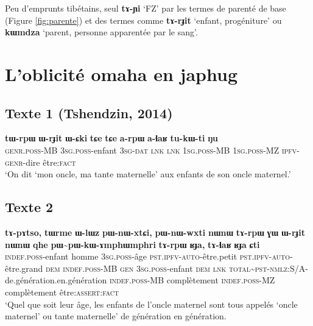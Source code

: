 \documentclass[oneside,a4paper,11pt]{article}
\newcommand{\ipa}[1]{{\phon\textbf{#1}}}
\newcommand{\tld}{\textasciitilde{}}
\begin{document}
Peu d'emprunts tibétains, seul \ipa{tɤ-ɲi} `FZ' par les termes de parenté de base (Figure \ref{fig:parente}) et des termes comme \ipa{tɤ-rɟit} `enfant, progéniture' ou \ipa{kɯmdza} `parent, personne apparentée par le sang'.
\section{L'oblicité omaha en japhug}
\subsection{Texte 1 (Tshendzin, 2014)}
\begin{exe}
\ex 
\gll 
 \ipa{tɯ-rpɯ} 	\ipa{ɯ-rɟit} 	\ipa{ɯ-ɕki} 	\ipa{tɕe} 	\ipa{tɕe} 	\ipa{a-rpɯ} \ipa{a-ɬaʁ} 	\ipa{tu-kɯ-ti} 	\ipa{ŋu}  \\
 \textsc{genr.poss}-MB \textsc{3sg.poss}-enfant \textsc{3sg-dat} \textsc{lnk}  \textsc{lnk}  \textsc{1sg.poss}-MB \textsc{1sg.poss}-MZ \textsc{ipfv-genr}-dire être:\textsc{fact} \\
\glt `On dit `mon oncle, ma tante maternelle' aux enfants de son oncle maternel.'
\end{exe}
\subsection{Texte 2}
\begin{exe}
\ex 
\gll 
\ipa{tɤ-pɤtso,} 	\ipa{tɯrme} 	\ipa{ɯ-lɯz} 	\ipa{pɯ-nɯ-xtɕi,} 	\ipa{pɯ-nɯ-wxti} 	\ipa{nɯnɯ} 	\ipa{tɤ-rpɯ} 	\ipa{ɣɯ} 	\ipa{ɯ-rɟit} 	\ipa{nɯnɯ} 	\ipa{qhe} 	\ipa{pɯ\tld{}pɯ-kɯ-ɤmphɯmphri} 	\ipa{tɤ-rpɯ} 	\ipa{ʁɟa,} 	\ipa{tɤ-ɬaʁ} 	\ipa{ʁɟa} 	\ipa{ɕti}   \\
 \textsc{indef.poss}-enfant homme  \textsc{3sg.poss}-âge \textsc{pst.ipfv-auto}-être.petit \textsc{pst.ipfv-auto}-être.grand \textsc{dem}    \textsc{indef.poss}-MB \textsc{gen} \textsc{3sg.poss}-enfant \textsc{dem} \textsc{lnk} \textsc{total\tld{}pst-nmlz:S/A}-de.génération.en.génération \textsc{indef.poss}-MB complètement \textsc{indef.poss}-MZ complètement être:\textsc{assert}:\textsc{fact} \\
\glt `Quel que soit leur âge, les enfants de l'oncle maternel sont tous appelés `oncle maternel' ou   tante maternelle' de génération en génération. 
\end{exe}
\end{document}
